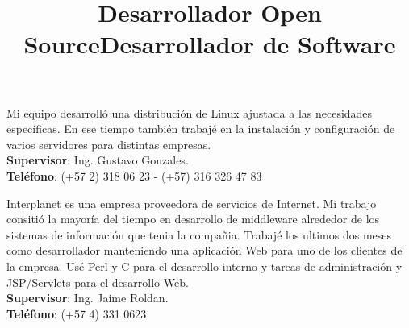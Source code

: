 \begin{resume}
\title{\textbf{Desarrollador Open Source}}
\begin{position}
Mi equipo desarroll\'{o} una distribuci\'{o}n de Linux ajustada a las
necesidades espec\'{i}ficas. En ese tiempo tambi\'{e}n trabaj\'{e} en
la instalaci\'{o}n y configuraci\'{o}n de varios servidores para
distintas empresas.\\
\textbf{Supervisor}: Ing. Gustavo Gonzales.\\
\textbf{Tel\'{e}fono}:  (+57 2) 318 06 23 - (+57) 316 326 47 83
\end{position}
 \newline
 \newline
 \newline
 \newline
 \newline
 \newline
 \newline
 \newline
 \newline
 \newline
 
                                   


\title{\textbf{Desarrollador de Software}}
\begin{position}
Interplanet es una empresa proveedora de servicios de Internet. Mi trabajo consiti\'{o} la mayor\'{i}a del tiempo en desarrollo de middleware alrededor de los sistemas de informaci\'{o}n que tenia  la compa\~{n}ia.
Trabaj\'{e} los ultimos dos meses como desarrollador manteniendo una aplicaci\'{o}n Web para uno de los clientes de la empresa. Us\'{e} Perl y C para el desarrollo interno y tareas de administraci\'{o}n y JSP/Servlets para el desarrollo Web.\\
\textbf{Supervisor}:  Ing. Jaime Roldan.\\
\textbf{Tel\'{e}fono}:  (+57 4) 331 0623 
\end{position}
\newline


\end{resume}
